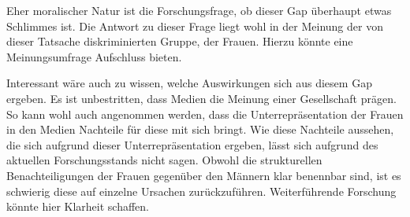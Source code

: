 Eher moralischer Natur ist die Forschungsfrage, ob dieser Gap überhaupt etwas
Schlimmes ist. Die Antwort zu dieser Frage liegt wohl in der Meinung der von
dieser Tatsache diskriminierten Gruppe, der Frauen. Hierzu könnte eine Meinungsumfrage
Aufschluss bieten.

Interessant wäre auch zu wissen, welche Auswirkungen sich aus diesem Gap ergeben.
Es ist unbestritten, dass Medien die Meinung einer Gesellschaft prägen. So kann
wohl auch angenommen werden, dass die Unterrepräsentation der Frauen in den Medien
Nachteile für diese mit sich bringt. Wie diese Nachteile aussehen, die sich aufgrund
dieser Unterrepräsentation ergeben, lässt sich aufgrund des aktuellen Forschungsstands
nicht sagen. Obwohl die strukturellen Benachteiligungen der Frauen gegenüber den Männern
klar benennbar sind, ist es schwierig diese auf einzelne Ursachen zurückzuführen. 
Weiterführende Forschung könnte hier Klarheit schaffen.
